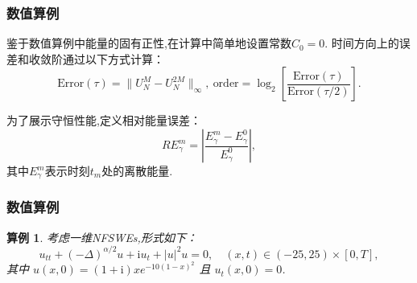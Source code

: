 \documentclass[aspectratio=169]{beamer}
\newtheorem{myexample}{算例}[section] %
\numberwithin{theorem}{section} %
\numberwithin{equation}{section}%
\numberwithin{figure}{section}%
\numberwithin{table}{section}%
\begin{document}
\begin{frame}\frametitle{数值算例}
	鉴于数值算例中能量的固有正性,在计算中简单地设置常数$C_0=0$.
	时间方向上的误差和收敛阶通过以下方式计算：
	\begin{equation}
		\text{Error}(\tau) = \|U_{N}^{M} - U_{N}^{2 M}\|_{\infty},~\text{order} = \log_{2}\left[\frac{\text{Error}(\tau)}{\text{Error}(\tau / 2)}\right].\label{eq_SAVRRK:104}
	\end{equation}

	为了展示守恒性能,定义相对能量误差：
	\begin{equation}\label{eq_SAVRRK:105}
		R E_{\gamma}^{m} = \left|\frac{E_{\gamma}^{m} - E_{\gamma}^{0}}{E_{\gamma}^{0}}\right|,
	\end{equation}
	其中$E_{\gamma}^{m}$表示时刻$t_m$处的离散能量.
\end{frame}
\begin{frame}\frametitle{数值算例}
		\begin{myexample}\label{exp_SAVRRK:1}
			考虑一维NFSWEs,形式如下\cite{ranLinearlyImplicitConservative2016}：
			\begin{equation}\label{eq_SAVRRK:108}
				u_{t t}+(-\Delta)^{\alpha / 2} u+\mathrm{i}u_t+|u|^2 u=0, \quad (x,t)\in  (-25, 25)\times[0, T],
			\end{equation}
			其中 $u(x, 0)=(1+\mathrm{i}) x e^{-10(1-x)^2}$ 且 $u_t(x, 0)=0$.
			\end{myexample}	
\end{frame}
\end{document}
